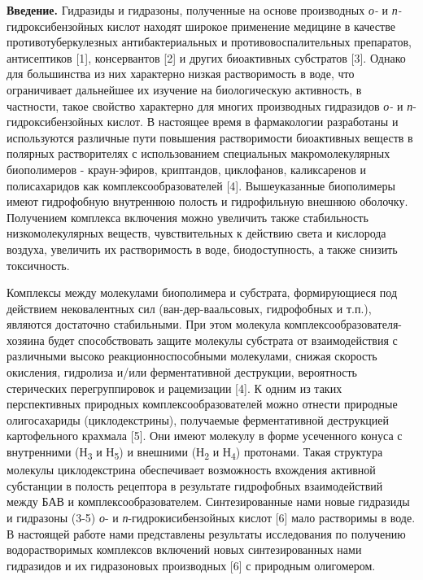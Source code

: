 {\bfseries Введение.} Гидразиды и гидразоны, полученные на основе
производных \emph{о-} и \emph{п-}гидроксибензойных кислот находят
широкое применение медицине в качестве противотуберкулезных
антибактериальных и противовоспалительных препаратов, антисептиков
{[}1{]}, консервантов {[}2{]} и других биоактивных субстратов {[}3{]}.
Однако для большинства из них характерно низкая растворимость в воде,
что ограничивает дальнейшее их изучение на биологическую активность, в
частности, такое свойство характерно для многих производных гидразидов
\emph{о-} и \emph{п}-гидроксибензойных кислот. В настоящее время в
фармакологии разработаны и используются различные пути повышения
растворимости биоактивных веществ в полярных растворителях с
использованием специальных макромолекулярных биополимеров -
краун-эфиров, криптандов, циклофанов, каликсаренов и полисахаридов как
комплексообразователей {[}4{]}. Вышеуказанные биополимеры имеют
гидрофобную внутреннюю полость и гидрофильную внешнюю оболочку.
Получением комплекса включения можно увеличить также стабильность
низкомолекулярных веществ, чувствительных к действию света и кислорода
воздуха, увеличить их растворимость в воде, биодоступность, а также
снизить токсичность.

Комплексы между молекулами биополимера и субстрата, формирующиеся под
действием нековалентных сил (ван-дер-ваальсовых, гидрофобных и т.п.),
являются достаточно стабильными. При этом молекула
комплексообразователя-хозяина будет способствовать защите молекулы
субстрата от взаимодействия с различными высоко реакционноспособными
молекулами, снижая скорость окисления, гидролиза и/или ферментативной
деструкции, вероятность стерических перегруппировок и рацемизации
{[}4{]}. К одним из таких перспективных природных комплексообразователей
можно отнести природные олигосахариды (циклодекстрины), получаемые
ферментативной деструкцией картофельного крахмала {[}5{]}. Они имеют
молекулу в форме усеченного конуса с внутренними (Н\textsubscript{3} и
Н\textsubscript{5}) и внешними (Н\textsubscript{2} и Н\textsubscript{4})
протонами. Такая структура молекулы циклодекстрина обеспечивает
возможность вхождения активной субстанции в полость рецептора в
результате гидрофобных взаимодействий между БАВ и
комплексообразователем. Синтезированные нами новые гидразиды и гидразоны
(3-5) \emph{о}- и \emph{п}-гидрокисибензойных кислот {[}6{]} мало
растворимы в воде. В настоящей работе нами представлены результаты
исследования по получению водорастворимых комплексов включений новых
синтезированных нами гидразидов и их гидразоновых производных {[}6{]} с
природным олигомером.

